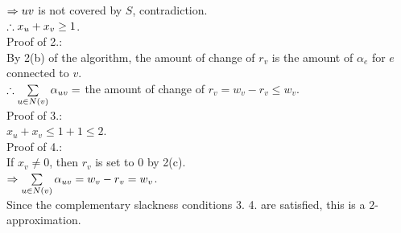\begin{pr}
$\Rightarrow uv$ is not covered by $S$, contradiction.\\
$\therefore x_u+x_v\geq1$.\\
Proof of 2.:\\
By 2(b) of the algorithm, the amount of change of $r_v$ is the amount of $\alpha_e$ for $e$ connected to $v$.\\
$\therefore\sum\limits_{u\in N(v)}\alpha_{uv}=$ the amount of change of $r_v=w_v-r_v\leq w_v$.\\
Proof of 3.:\\
$x_u+x_v\leq1+1\leq2$.\\
Proof of 4.:\\
If $x_v\neq0$, then $r_v$ is set to $0$ by 2(c).\\
$\Rightarrow\sum\limits_{u\in N(v)}\alpha_{uv}=w_v-r_v=w_v$.\\
Since the complementary slackness conditions 3. 4. are satisfied, this is a $2$-approximation.
\end{pr}

